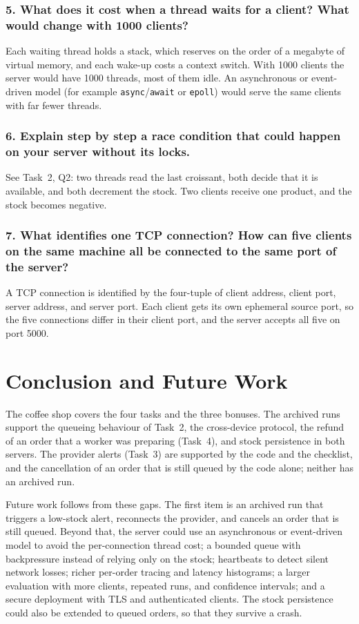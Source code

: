 \documentclass[12pt,a4paper]{article}
\begin{document}
    \subsubsection{5. What does it cost when a thread waits for a client? What would change with 1000 clients?}
    Each waiting thread holds a stack, which reserves on the order of a megabyte of virtual
    memory, and each wake-up costs a context switch. With 1000 clients the server would have
    1000 threads, most of them idle. An asynchronous or event-driven model (for example
    \texttt{async}/\texttt{await} or \texttt{epoll}) would serve the same clients with far
    fewer threads.

    \subsubsection{6. Explain step by step a race condition that could happen on your server without its locks.}
    See Task~2, Q2: two threads read the last croissant, both decide that it is available,
    and both decrement the stock. Two clients receive one product, and the stock becomes
    negative.

    \subsubsection{7. What identifies one TCP connection? How can five clients on the same machine all be connected to the same port of the server?}
    A TCP connection is identified by the four-tuple of client address, client port, server
    address, and server port. Each client gets its own ephemeral source port, so the five
    connections differ in their client port, and the server accepts all five on port 5000.

\section{Conclusion and Future Work}
\label{sec:conclusion}

The coffee shop covers the four tasks and the three bonuses. The archived runs support the
queueing behaviour of Task~2, the cross-device protocol, the refund of an order that a worker
was preparing (Task~4), and stock persistence in both servers. The provider alerts (Task~3)
are supported by the code and the checklist, and the cancellation of an order that is still
queued by the code alone; neither has an archived run.

Future work follows from these gaps. The first item is an archived run that triggers a
low-stock alert, reconnects the provider, and cancels an order that is still queued. Beyond
that, the server could use an asynchronous or event-driven model to avoid the per-connection
thread cost; a bounded queue with backpressure instead of relying only on the
stock; heartbeats to detect silent network losses; richer per-order tracing and latency
histograms; a larger evaluation with more clients, repeated runs, and confidence intervals; and
a secure deployment with TLS and authenticated clients. The stock persistence could also be
extended to queued orders, so that they survive a crash.
\end{document}
